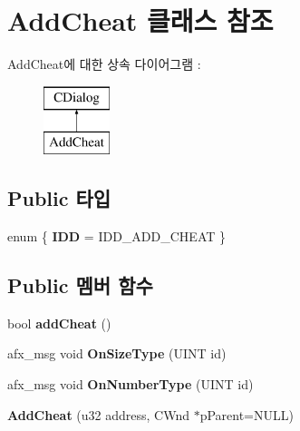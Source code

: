 \hypertarget{class_add_cheat}{}\section{Add\+Cheat 클래스 참조}
\label{class_add_cheat}
Add\+Cheat에 대한 상속 다이어그램 \+: \begin{figure}[H]
\begin{center}
\leavevmode
\includegraphics[height=2.000000cm]{class_add_cheat}
\end{center}
\end{figure}
\subsection*{Public 타입}
\begin{DoxyCompactItemize}
\item 
\mbox{\label{class_add_cheat_af696833b823db49de5667fcb42b11a26}} 
enum \{ {\bfseries I\+DD} = I\+D\+D\+\_\+\+A\+D\+D\+\_\+\+C\+H\+E\+AT
 \}
\end{DoxyCompactItemize}
\subsection*{Public 멤버 함수}
\begin{DoxyCompactItemize}
\item 
\mbox{\label{class_add_cheat_a53989b2f3f179185384d258c9e71ace7}} 
bool {\bfseries add\+Cheat} ()
\item 
\mbox{\label{class_add_cheat_ae9762fec683ccd9972d29fec47eecba4}} 
afx\+\_\+msg void {\bfseries On\+Size\+Type} (U\+I\+NT id)
\item 
\mbox{\label{class_add_cheat_a3ac4c44d5f9ec5037e92034789c276b4}} 
afx\+\_\+msg void {\bfseries On\+Number\+Type} (U\+I\+NT id)
\item 
\mbox{\label{class_add_cheat_afa75eefc22d2f9449cf3b9283926408c}} 
{\bfseries Add\+Cheat} (u32 address, C\+Wnd $\ast$p\+Parent=N\+U\+LL)
\end{DoxyCompactItemize}
